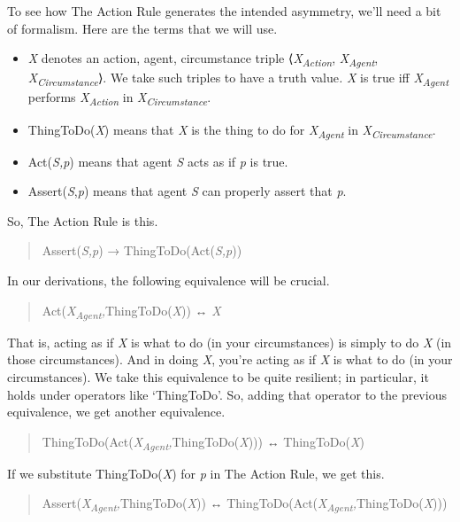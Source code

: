 \documentclass[
  10pt,
  letterpaper,
  DIV=11,
  numbers=noendperiod,
  twoside]{scrartcl}
\providecommand{\tightlist}{%
  \setlength{\itemsep}{0pt}\setlength{\parskip}{0pt}}\usepackage{longtable,booktabs,array}
\begin{document}
To see how The Action Rule generates the intended asymmetry, we'll need
a bit of formalism. Here are the terms that we will use.

\begin{itemize}
\tightlist
\item
  \emph{X} denotes an action, agent, circumstance triple
  ⟨\emph{X\textsubscript{Action}}, \emph{X\textsubscript{Agent}},
  \emph{X\textsubscript{Circumstance}}⟩. We take such triples to have a
  truth value\emph{.} \emph{X} is true iff \emph{X\textsubscript{Agent}}
  performs \emph{X\textsubscript{Action}} in
  \emph{X\textsubscript{Circumstance}}.
\item
  ThingToDo(\emph{X}) means that \emph{X} is the thing to do for
  \emph{X\textsubscript{Agent}} in \emph{X\textsubscript{Circumstance}}.
\item
  Act(\emph{S,p}) means that agent \emph{S} acts as if \emph{p} is true.
\item
  Assert(\emph{S},\emph{p}) means that agent \emph{S} can properly
  assert that \emph{p}.
\end{itemize}

So, The Action Rule is this.

\begin{quote}
Assert(\emph{S,p}) → ThingToDo(Act(\emph{S,p}))
\end{quote}

In our derivations, the following equivalence will be crucial.

\begin{quote}
Act(\emph{X\textsubscript{Agent},}ThingToDo(\emph{X})) ↔ \emph{X}
\end{quote}

That is, acting as if \emph{X} is what to do (in your circumstances) is
simply to do \emph{X} (in those circumstances). And in doing \emph{X},
you're acting as if \emph{X} is what to do (in your circumstances). We
take this equivalence to be quite resilient; in particular, it holds
under operators like `ThingToDo'. So, adding that operator to the
previous equivalence, we get another equivalence.

\begin{quote}
ThingToDo(Act(\emph{X\textsubscript{Agent},}ThingToDo(\emph{X}))) ↔
ThingToDo(\emph{X})
\end{quote}

If we substitute ThingToDo(\emph{X}) for \emph{p} in The Action Rule, we
get this.

\begin{quote}
Assert(\emph{X\textsubscript{Agent},}ThingToDo(\emph{X})) ↔
ThingToDo(Act(\emph{X\textsubscript{Agent},}ThingToDo(\emph{X})))
\end{quote}
\end{document}
